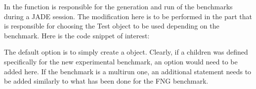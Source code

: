 \documentclass[letterpaper,10pt,english]{sphinxmanual}
\begin{document}
In  the function  is responsible for
the generation and run of the benchmarks during a JADE session. The modification here is to be performed
in the part that is responsible for choosing the Test object to be used depending on the benchmark.
Here is the code snippet of interest:

\begin{sphinxVerbatim}[commandchars=\\\{\}]

   
      

   
      

   
      

   
       

      

\end{sphinxVerbatim}

The default option is to simply create a  object. Clearly, if a children was defined
specifically for the new experimental benchmark, an option would need to be added here.
If the benchmark is a multirun one, an additional  statement needs to be added similarly
to what has been done for the FNG benchmark.
\end{document}
